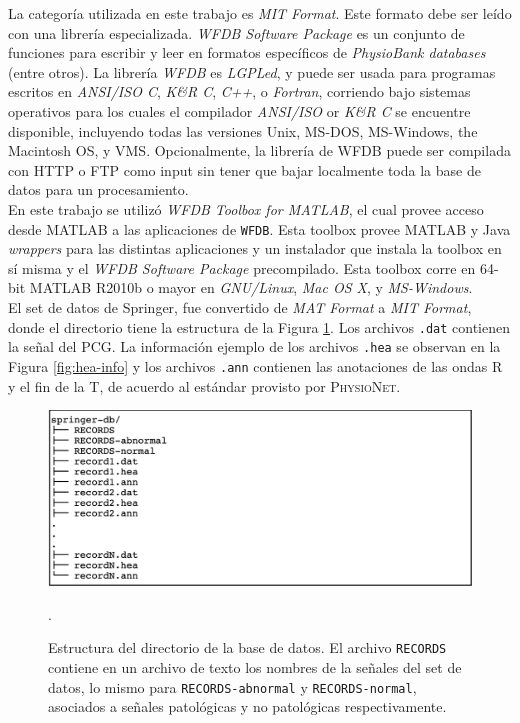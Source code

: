 \indent La categoría utilizada en este trabajo es \textit{MIT Format}. Este formato debe ser leído con una librería
especializada. \textit{WFDB Software Package} es un conjunto de funciones para escribir y leer en formatos
específicos de \textit{PhysioBank databases} (entre otros). La librería \textit{WFDB} es \textit{LGPLed}, y puede
ser usada para programas escritos en \textit{ANSI/ISO C}, \textit{K\&R C}, \textit{C++}, o \textit{Fortran},
corriendo bajo sistemas operativos para los cuales el compilador \textit{ANSI/ISO} or \textit{K\&R C} se encuentre
disponible, incluyendo todas las versiones Unix, MS-DOS, MS-Windows, the Macintosh OS, y VMS. Opcionalmente, la
librería de WFDB puede ser compilada con HTTP o FTP como input sin tener que bajar localmente toda la base de datos
para un procesamiento. \\
\indent En este trabajo se utilizó \textit{WFDB Toolbox for MATLAB\texttrademark}, el cual provee acceso desde
\textsc{MATLAB\texttrademark} a las aplicaciones de \texttt{WFDB}. Esta toolbox provee \textsc{MATLAB\texttrademark} y
Java
\textit{wrappers} para las distintas aplicaciones y un instalador que instala la toolbox en sí misma y el
\textit{WFDB Software Package} precompilado. Esta toolbox corre en 64-bit \textsc{MATLAB\texttrademark} R2010b o
mayor en \textit{GNU/Linux}, \textit{Mac OS X}, y \textit{MS-Windows}. \\
\indent El set de datos de Springer, fue convertido de \textit{MAT Format} a \textit{MIT Format}, donde el
directorio tiene la estructura de la Figura \ref{fig:springer-db}. Los archivos \texttt{.dat} contienen la señal del
PCG. La información ejemplo de los archivos \texttt{.hea} se observan en la Figura \ref{fig:hea-info} y los archivos
\texttt{.ann} contienen las anotaciones de las ondas R y el fin de la T, de acuerdo al estándar provisto por
\textsc{PhysioNet}.

\begin{figure}[H]
  \centering
  \includegraphics[scale=0.73]{chapters/chapter-03/images/springer-db.png}
  \caption[Estructura del directorio de la base de datos.]{Estructura del directorio de la base de datos. El
  archivo \texttt{RECORDS} contiene en un archivo de texto los nombres de la señales del set de datos, lo mismo
  para \texttt{RECORDS-abnormal} y \texttt{RECORDS-normal}, asociados a señales patológicas y no patológicas
  respectivamente.}.
  \label{fig:springer-db}
\end{figure}

